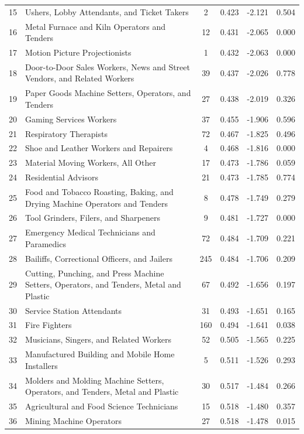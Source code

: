 {\begin{longtable}{llcccc}
 15 & Ushers, Lobby Attendants, and Ticket Takers & 2 & 0.423 & -2.121 & 0.504 \\
 16 & Metal Furnace and Kiln Operators and Tenders & 12 & 0.431 & -2.065 & 0.000 \\
 17 & Motion Picture Projectionists & 1 & 0.432 & -2.063 & 0.000 \\
 18 & Door-to-Door Sales Workers, News and Street Vendors, and Related Workers & 39 & 0.437 & -2.026 & 0.778 \\
 19 & Paper Goods Machine Setters, Operators, and Tenders & 27 & 0.438 & -2.019 & 0.326 \\
 20 & Gaming Services Workers & 37 & 0.455 & -1.906 & 0.596 \\
 21 & Respiratory Therapists & 72 & 0.467 & -1.825 & 0.496 \\
 22 & Shoe and Leather Workers and Repairers & 4 & 0.468 & -1.816 & 0.000 \\
 23 & Material Moving Workers, All Other & 17 & 0.473 & -1.786 & 0.059 \\
 24 & Residential Advisors & 21 & 0.473 & -1.785 & 0.774 \\
 25 & Food and Tobacco Roasting, Baking, and Drying Machine Operators and Tenders & 8 & 0.478 & -1.749 & 0.279 \\
 26 & Tool Grinders, Filers, and Sharpeners & 9 & 0.481 & -1.727 & 0.000 \\
 27 & Emergency Medical Technicians and Paramedics & 72 & 0.484 & -1.709 & 0.221 \\
 28 & Bailiffs, Correctional Officers, and Jailers & 245 & 0.484 & -1.706 & 0.209 \\
 29 & Cutting, Punching, and Press Machine Setters, Operators, and Tenders, Metal and Plastic & 67 & 0.492 & -1.656 & 0.197 \\
 30 & Service Station Attendants & 31 & 0.493 & -1.651 & 0.165 \\
 31 & Fire Fighters & 160 & 0.494 & -1.641 & 0.038 \\
 32 & Musicians, Singers, and Related Workers & 52 & 0.505 & -1.565 & 0.225 \\
 33 & Manufactured Building and Mobile Home Installers & 5 & 0.511 & -1.526 & 0.293 \\
 34 & Molders and Molding Machine Setters, Operators, and Tenders, Metal and Plastic & 30 & 0.517 & -1.484 & 0.266 \\
 35 & Agricultural and Food Science Technicians & 15 & 0.518 & -1.480 & 0.357 \\
 36 & Mining Machine Operators & 27 & 0.518 & -1.478 & 0.015 \\

\end{longtable}}
